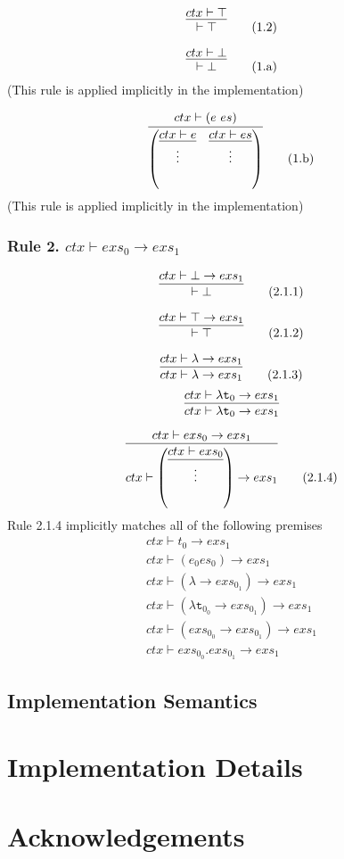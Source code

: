 \documentclass[a4paper,11pt]{article}
\begin{document}
\begin{equation}
\infer{\vdash \top}{ctx \vdash \top} \tag{1.2}
\end{equation}

\begin{equation}
\infer{\vdash \bot}{ctx \vdash \bot} \tag{1.a}
\end{equation}
(This rule is applied implicitly in the implementation)

\begin{equation}
\infer{ \left(\infer{\vdots}{ctx \vdash e}\quad\infer{\vdots}{ctx \vdash es}\right) }{ ctx \vdash (e\ es) } \tag{1.b}
\end{equation}
(This rule is applied implicitly in the implementation)

\subsubsection{Rule 2. $ctx \vdash exs_0 \rightarrow exs_1$ }
\begin{equation}
\infer{\vdash \bot}{ctx \vdash \bot \rightarrow exs_1} \tag{2.1.1}
\end{equation}

\begin{equation}
\infer{\vdash \top}{ctx \vdash \top \rightarrow exs_1} \tag{2.1.2}
\end{equation}

\begin{equation}
\infer{ctx \vdash \lambda \rightarrow exs_1}{ctx \vdash \lambda \rightarrow exs_1} \tag{2.1.3}
\end{equation}
\begin{equation*}
\infer{ctx \vdash \lambda \texttt{t}_0 \rightarrow exs_1}{ctx \vdash \lambda \texttt{t}_0 \rightarrow exs_1}
\end{equation*}

\begin{equation}
\infer{ctx \vdash \left(\infer{\vdots}{ctx \vdash exs_0}\right) \rightarrow exs_1}{ctx \vdash exs_0 \rightarrow exs_1} \tag{2.1.4}
\end{equation}
Rule 2.1.4 implicitly matches all of the following premises
\begin{eqnarray*}
ctx \vdash t_0 \rightarrow exs_1\\
ctx \vdash (e_0 es_0) \rightarrow exs_1\\
ctx \vdash (\lambda \rightarrow exs_{0_1}) \rightarrow exs_1\\
ctx \vdash (\lambda \texttt{t}_{0_0} \rightarrow exs_{0_1}) \rightarrow exs_1\\
ctx \vdash (exs_{0_0} \rightarrow exs_{0_1}) \rightarrow exs_1\\
ctx \vdash exs_{0_0} . exs_{0_1}  \rightarrow exs_1
\end{eqnarray*}


\subsection{Implementation Semantics}

\section{Implementation Details}

\section*{Acknowledgements}



\end{document}
